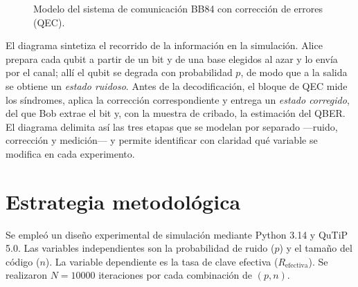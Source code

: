 \documentclass[12pt]{report}
\begin{document}
\begin{figure}[H]
\centering
{}
\caption{Modelo del sistema de comunicación BB84 con corrección de errores (QEC).}
\label{fig:modelo}
\end{figure}

El diagrama sintetiza el recorrido de la información en la simulación. Alice
prepara cada qubit a partir de un bit y de una base elegidos al azar y lo envía
por el canal; allí el qubit se degrada con probabilidad \(p\), de modo que a la
salida se obtiene un \textit{estado ruidoso}. Antes de la decodificación, el
bloque de QEC mide los síndromes, aplica la corrección correspondiente y entrega
un \textit{estado corregido}, del que Bob extrae el bit y, con la muestra de
cribado, la estimación del QBER. El diagrama delimita así las tres etapas que se
modelan por separado —ruido, corrección y medición— y permite identificar con
claridad qué variable se modifica en cada experimento.

\section{Estrategia metodológica}
Se empleó un diseño experimental de simulación mediante Python 3.14 y QuTiP 5.0. Las variables independientes son la probabilidad de ruido (\(p\)) y el tamaño del código (\(n\)). La variable dependiente es la tasa de clave efectiva (\(R_{\text{efectiva}}\)). Se realizaron \(N=10000\) iteraciones por cada combinación de \((p, n)\).
\end{document}
